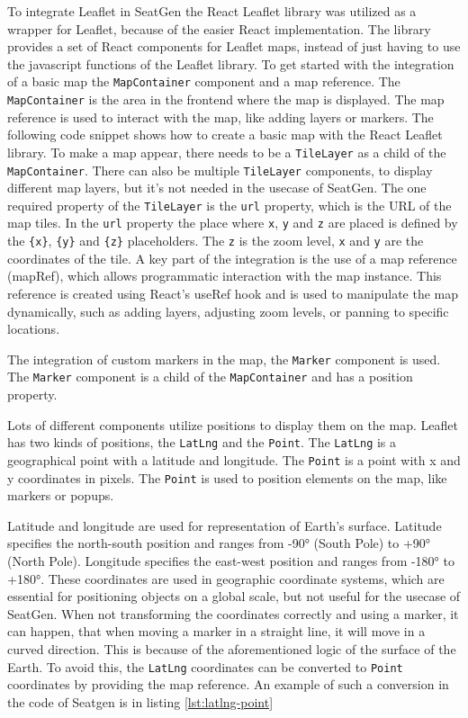 To integrate Leaflet\cite{LeafletGitHub} in SeatGen the React Leaflet library\cite{ReactLeafletDocs2} was utilized as a wrapper for Leaflet, because of the easier React implementation. The library provides a set of React components for Leaflet maps, instead of just having to use the javascript functions of the Leaflet library. To get started with the integration of a basic map the \texttt{MapContainer} component and a map reference. The \texttt{MapContainer} is the area in the frontend where the map is displayed. The map reference is used to interact with the map, like adding layers or markers. The following code snippet shows how to create a basic map with the React Leaflet library. To make a map appear, there needs to be a \texttt{TileLayer} as a child of the \texttt{MapContainer}. There can also be multiple \texttt{TileLayer} components, to display different map layers, but it's not needed in the usecase of SeatGen. The one required property of the \texttt{TileLayer} is the \texttt{url} property, which is the URL of the map tiles. In the \texttt{url} property the place where \texttt{x}, \texttt{y} and \texttt{z} are placed is defined by the \texttt{\{x\}}, \texttt{\{y\}} and \texttt{\{z\}} placeholders. The \texttt{z} is the zoom level, \texttt{x} and \texttt{y} are the coordinates of the tile. A key part of the integration is the use of a map reference (mapRef), which allows programmatic interaction with the map instance. This reference is created using React’s useRef hook and is used to manipulate the map dynamically, such as adding layers, adjusting zoom levels, or panning to specific locations.

The integration of custom markers in the map, the \texttt{Marker} component is used. The \texttt{Marker} component is a child of the \texttt{MapContainer} and has a position property.

Lots of different components utilize positions to display them on the map. Leaflet has two kinds of positions, the \texttt{LatLng} and the \texttt{Point}. The \texttt{LatLng} is a geographical point with a latitude and longitude. The \texttt{Point} is a point with x and y coordinates in pixels. The \texttt{Point} is used to position elements on the map, like markers or popups. 

Latitude and longitude are used for representation of Earth's surface. Latitude specifies the north-south position and ranges from -90° (South Pole) to +90° (North Pole). Longitude specifies the east-west position and ranges from -180° to +180°. These coordinates are used in geographic coordinate systems, which are essential for positioning objects on a global scale, but not useful for the usecase of SeatGen. When not transforming the coordinates correctly and using a marker, it can happen, that when moving a marker in a straight line, it will move in a curved direction. This is because of the aforementioned logic of the surface of the Earth. To avoid this, the \texttt{LatLng} coordinates can be converted to \texttt{Point} coordinates by providing the map reference. An example of such a conversion in the code of Seatgen is in listing \ref{lst:latlng-point}

